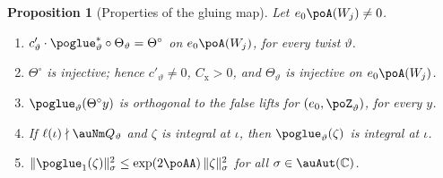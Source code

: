 \documentclass[10pt]{amsart}
\newtheorem{proposition}[theorem]{Proposition}
\theoremstyle{definition}
\theoremstyle{remark}
\newcommand{\C}{\mathbb C}
\begin{document}
\begin{proposition}[Properties of the gluing map]\label{po:glue}
Let $e_0\poA(W_j)\ne0$.
\begin{enumerate}
\item[(G1)] $c'_\vartheta\cdot\poglue_\vartheta^*\circ\Theta_\vartheta=\Theta^\circ$ on
$e_0\poA(W_j)$, for every twist $\vartheta$.
\item[(G2)] $\Theta^\circ$ is injective; hence $c'_\vartheta\ne0$, $C_{\mathrm x}>0$, and
$\Theta_\vartheta$ is injective on $e_0\poA(W_j)$.
\item[(G3)] $\poglue_\vartheta(\Theta^\circ y)$ is orthogonal to the false lifts for
$(e_0,\poZ_\vartheta)$, for every $y$.
\item[(G4)] If $\ell(\iota)\nmid\auNm Q_\vartheta$ and $\zeta$ is integral at $\iota$, then
$\poglue_\vartheta(\zeta)$ is integral at $\iota$.
\item[(G5)] $\|\poglue_1(\zeta)\|_\sigma^2\le\exp(2\poAA)\,\|\zeta\|_\sigma^2$ for all $\sigma\in
\auAut(\C)$.
\end{enumerate}
\end{proposition}
\end{document}
